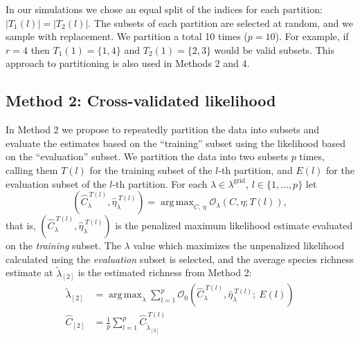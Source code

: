 \documentclass[12pt]{article}
\DeclareMathOperator*{\argmax}{arg\,max}
\newcommand{\lambdagrid}{\lambda^{\text{grid}}}
\theoremstyle{break}
\theoremstyle{break}
\begin{document}
In our simulations we chose an equal split of the indices for each partition: $|T_1(l)| = |T_2(l)|$.  The subsets of each partition are selected at random, and we sample with replacement.  We partition a total 10 times ($p = 10$).  For example, if $r = 4$ then $T_1(1) = \{1,4\}$ and $T_2(1) = \{2, 3\}$ would be valid subsets.  This approach to partitioning is also used in Methods 2 and 4.

\subsection{Method 2: Cross-validated likelihood}


In Method 2 we propose to repeatedly partition the data into subsets and evaluate the estimates based on the ``training'' subset using the likelihood based on the ``evaluation'' subset.
We partition the data into two subsets $p$ times, calling them $T(l)$ for the training subset of the $l$-th partition, and $E(l)$ for the evaluation subset of the $l$-th partition. For each $\lambda \in \lambdagrid$, $l \in \{1, \dots , p\}$ let
\begin{equation}
\left(\widehat{C}_{\lambda}^{ \ T(l)}, \widehat{\eta}_{\lambda}^{ \ T(l)} \right) = \argmax_{C, \, \eta} \mathcal{O}_\lambda \left(C, \eta; T(l) \right), \label{eq:part_c_hats_method_2}
\end{equation}
that is, $\left(\widehat{C}_{\lambda}^{ \ T(l)}, \widehat{\eta}_{\lambda}^{ \ T(l)} \right)$ is the penalized maximum likelihood estimate evaluated on the \textit{training} subset.  The $\lambda$ value which maximizes the unpenalized likelihood calculated using the \textit{evaluation} subset is selected, and the average species richness estimate at $\widetilde{\lambda}_{[2]}$ is the estimated richness from Method 2:
\begin{align}
\widetilde{\lambda}_{[2]} &= \argmax_\lambda \sum_{l=1}^p \mathcal{O}_0\left( \widehat{C}_{\lambda}^{ \ T(l)}, \widehat{\eta}_{\lambda}^{ \ T(l)} ; \  E(l) \right) \label{eq:selected_lambda_2} \\
\widehat{C}_{[2]} &= \frac{1}{p} \sum_{l=1}^p \widehat{C}_{\widetilde{\lambda}_{[2]}}^{ \ T(l)}
\end{align}
\end{document}
